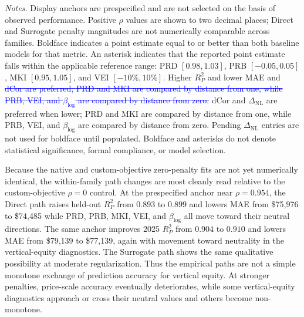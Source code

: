 \documentclass[10pt]{article}
\theoremstyle{definition}
\newcommand{\1}{\mathbf{1}}
\newcommand{\oldtext}[1]{\textcolor{blue}{\sout{#1}}}
\newcommand{\newtext}[1]{\textcolor{impGreen}{#1}}
\begin{document}
\begin{table}[!htbp]
{\begin{tabular}{llrrrrrrrrr}
\bottomrule
\end{tabular}
}

\vspace{1mm}
\begin{minipage}{\textwidth}
\scriptsize
\emph{Notes.}
Display anchors are prespecified and are not selected on the basis of observed
performance. Positive $\rho$ values are shown to two decimal places; Direct and
Surrogate penalty magnitudes are not numerically comparable across families.
Boldface indicates a point estimate equal to or better than both baseline models
for that metric. An asterisk indicates that the reported point estimate falls
within the applicable reference range: PRD $[0.98,1.03]$, PRB $[-0.05,0.05]$,
MKI $[0.95,1.05]$, and VEI $[-10\%,10\%]$. Higher $R^2_P$ and lower MAE and
\oldtext{dCor are preferred; PRD and MKI are compared by distance from one, while PRB, VEI, and $\beta_{\log}$ are compared by distance from zero.}
\newtext{dCor and $\Delta_{\mathrm{NL}}$ are preferred when lower; PRD and MKI are compared by distance from one, while PRB, VEI, and $\beta_{\log}$ are compared by distance from zero. Pending $\Delta_{\mathrm{NL}}$ entries are not used for boldface until populated.} Boldface and
asterisks do not denote statistical significance, formal compliance, or model
selection.
\end{minipage}

\end{table} 

Because the native and custom-objective zero-penalty fits are not yet numerically
identical, the within-family path changes are most cleanly read relative to the
custom-objective $\rho=0$ control. At the prespecified anchor near
$\rho=0.954$, the Direct path raises held-out $R^2_P$ from $0.893$ to $0.899$
and lowers MAE from \$75,976 to \$74,485 while PRD, PRB, MKI, VEI, and
$\beta_{\log}$ all move toward their neutral directions. The same anchor improves
2025 $R^2_P$ from $0.904$ to $0.910$ and lowers MAE from \$79,139 to
\$77,139, again with movement toward neutrality in the vertical-equity
diagnostics. The Surrogate path shows the same qualitative possibility at moderate
regularization. 
\newtext{Thus the empirical paths are not a simple monotone exchange of prediction accuracy for vertical equity. At stronger penalties, price-scale accuracy eventually deteriorates, while some vertical-equity diagnostics approach or cross their neutral values and others become non-monotone.}
\end{document}
